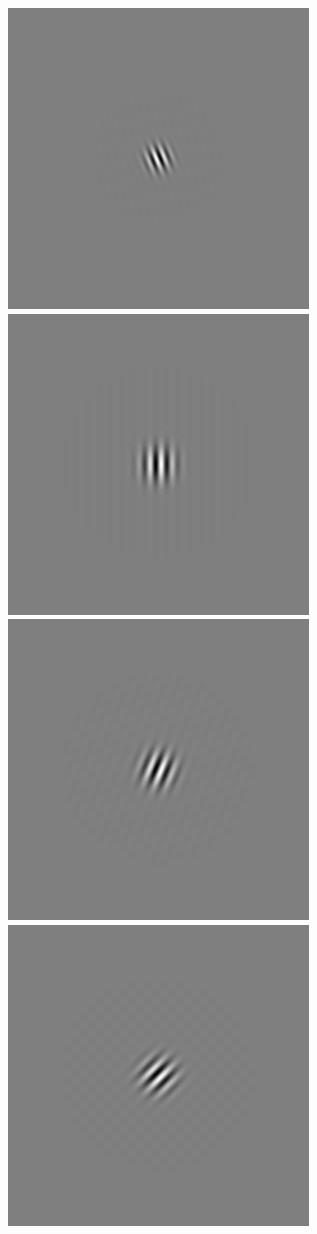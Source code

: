 \begin{figure}
\begin{center}
 \includegraphics[scale=0.1]{ch4/figures/iGabor1_7.jpg}\\
 \includegraphics[scale=0.1]{ch4/figures/iGabor2_0.jpg}
 \includegraphics[scale=0.1]{ch4/figures/iGabor2_1.jpg}
 \includegraphics[scale=0.1]{ch4/figures/iGabor2_2.jpg}

\end{center}
\end{figure}
